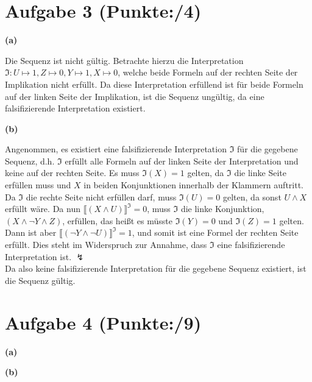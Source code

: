 \documentclass[11pt, a4paper]{article}
\newcommand{\pp}{4}
\newcommand{\ppp}{9}
\begin{document}
\section*{Aufgabe 3 (Punkte:\qquad/\pp)}
\textbf{(a)}
\begin{adjustwidth}{20pt}{20pt}
Die Sequenz ist nicht gültig. Betrachte hierzu die Interpretation $\mathfrak{I}:U \mapsto 1,Z \mapsto 0, Y \mapsto 1, X \mapsto 0$, welche beide Formeln auf der rechten Seite
der Implikation nicht erfüllt. Da diese Interpretation erfüllend ist für beide Formeln auf der linken Seite der Implikation, ist die Sequenz ungültig, da eine falsifizierende Interpretation
existiert.
\end{adjustwidth}
\textbf{(b)}
\begin{adjustwidth}{20pt}{20pt}
Angenommen, es existiert eine falsifizierende Interpretation $\mathfrak{I}$ für die gegebene Sequenz, d.h. $\mathfrak{I}$ erfüllt alle Formeln auf der linken Seite der Interpretation
und keine auf der rechten Seite. Es muss $\mathfrak{I}(X)=1$ gelten, da $\mathfrak{I}$ die linke Seite erfüllen muss und $X$ in beiden Konjunktionen innerhalb der Klammern auftritt.
Da $\mathfrak{I}$ die rechte Seite nicht erfüllen darf, muss $\mathfrak{I}(U)=0$ gelten, da sonst $U \wedge X$ erfüllt wäre. Da nun $\llbracket (X \wedge U)\rrbracket^\mathfrak{I}=0$,
muss $\mathfrak{I}$ die linke Konjunktion, $(X \wedge \neg Y \wedge Z)$, erfüllen, das heißt es müsste $\mathfrak{I}(Y)=0$ und $\mathfrak{I}(Z)=1$ gelten. Dann ist aber
$\llbracket (\neg Y \wedge \neg U)\rrbracket^\mathfrak{I}=1$, und somit ist eine Formel der rechten Seite erfüllt. Dies steht im Widerspruch zur Annahme, dass $\mathfrak{I}$ eine
falsifizierende Interpretation ist. $\lightning$\\
Da also keine falsifizierende Interpretation für die gegebene Sequenz existiert, ist die Sequenz gültig.
\end{adjustwidth}



\section*{Aufgabe 4 (Punkte:\qquad/\ppp)}
\textbf{(a)}
\begin{adjustwidth}{20pt}{20pt}

\end{adjustwidth}
\textbf{(b)}
\begin{adjustwidth}{20pt}{20pt}

\end{adjustwidth}
\end{document}
